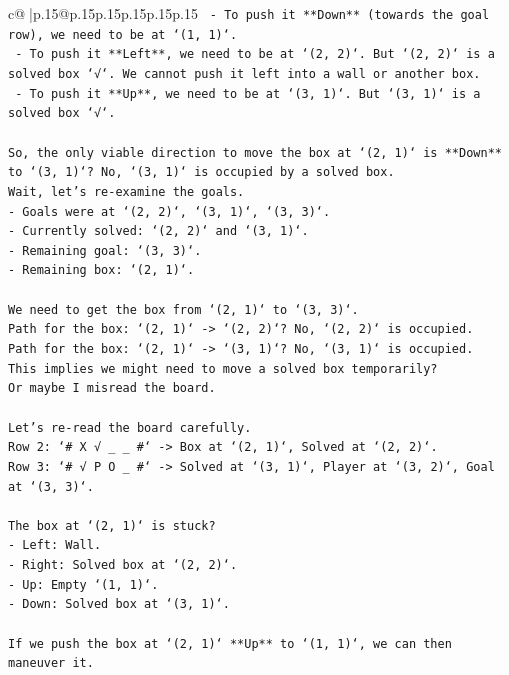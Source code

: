 \documentclass{article}
\begin{document}
{\begin{supertabular}{c@{$\;$}|p{.15\linewidth}@{}p{.15\linewidth}p{.15\linewidth}p{.15\linewidth}p{.15\linewidth}p{.15\linewidth}}
{{{\texttt{  {-} To push it **Down** (towards the goal row), we need to be at `(1, 1)`.} \\
\texttt{  {-} To push it **Left**, we need to be at `(2, 2)`. But `(2, 2)` is a solved box `√`. We cannot push it left into a wall or another box.} \\
\texttt{  {-} To push it **Up**, we need to be at `(3, 1)`. But `(3, 1)` is a solved box `√`.} \\
\\ 
\texttt{So, the only viable direction to move the box at `(2, 1)` is **Down** to `(3, 1)`? No, `(3, 1)` is occupied by a solved box.} \\
\texttt{Wait, let's re{-}examine the goals.} \\
\texttt{{-} Goals were at `(2, 2)`, `(3, 1)`, `(3, 3)`.} \\
\texttt{{-} Currently solved: `(2, 2)` and `(3, 1)`.} \\
\texttt{{-} Remaining goal: `(3, 3)`.} \\
\texttt{{-} Remaining box: `(2, 1)`.} \\
\\ 
\texttt{We need to get the box from `(2, 1)` to `(3, 3)`.} \\
\texttt{Path for the box: `(2, 1)` {-}> `(2, 2)`? No, `(2, 2)` is occupied.} \\
\texttt{Path for the box: `(2, 1)` {-}> `(3, 1)`? No, `(3, 1)` is occupied.} \\
\texttt{This implies we might need to move a solved box temporarily?} \\
\texttt{Or maybe I misread the board.} \\
\\ 
\texttt{Let's re{-}read the board carefully.} \\
\texttt{Row 2: `\# X √ \_ \_ \#` {-}> Box at `(2, 1)`, Solved at `(2, 2)`.} \\
\texttt{Row 3: `\# √ P O \_ \#` {-}> Solved at `(3, 1)`, Player at `(3, 2)`, Goal at `(3, 3)`.} \\
\\ 
\texttt{The box at `(2, 1)` is stuck?} \\
\texttt{{-} Left: Wall.} \\
\texttt{{-} Right: Solved box at `(2, 2)`.} \\
\texttt{{-} Up: Empty `(1, 1)`.} \\
\texttt{{-} Down: Solved box at `(3, 1)`.} \\
\\ 
\texttt{If we push the box at `(2, 1)` **Up** to `(1, 1)`, we can then maneuver it.} \\
}}}
\end{supertabular}}
\end{document}
